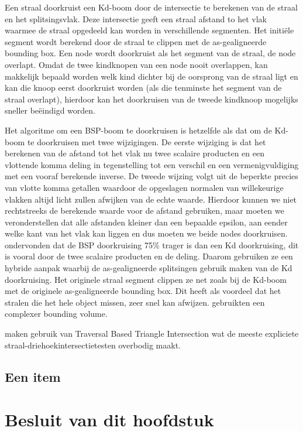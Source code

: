 Een straal doorkruist een Kd-boom door de intersectie te berekenen van de straal en het splitsingsvlak.  
Deze intersectie geeft een straal afstand to het vlak waarmee de straal opgedeeld kan worden in verschillende segmenten.
Het initiële segment wordt berekend door de straal te clippen met de as-gealigneerde bounding box. 
Een node wordt doorkruist als het segment van de straal, de node overlapt.
Omdat de twee kindknopen van een node nooit overlappen, kan makkelijk bepaald worden welk kind dichter bij de oorsprong van de straal ligt en kan die knoop eerst doorkruist worden (als die tenminste het segment van de straal overlapt), hierdoor kan het doorkruisen van de tweede kindknoop mogelijks sneller beëindigd worden. 

Het algoritme om een BSP-boom te doorkruisen is hetzelfde als dat om de Kd-boom te doorkruisen met twee wijzigingen.
De eerste wijziging is dat het berekenen van de afstand tot het vlak nu twee scalaire producten en een vlottende komma deling in tegenstelling tot een verschil en een vermenigvuldiging met een vooraf berekende inverse.
De tweede wijzing volgt uit de beperkte precies van vlotte komma getallen waardoor de opgeslagen normalen van willekeurige vlakken altijd licht zullen afwijken van de echte waarde.
Hierdoor kunnen we niet rechtstreeks de berekende waarde voor de afstand gebruiken, maar moeten we veronderstellen dat alle afstanden kleiner dan een bepaalde epsilon, aan eender welke kant van het vlak kan liggen en dus moeten we beide nodes doorkruisen.
\authorIze{ }ondervonden dat de BSP doorkruising 75\% trager is dan een Kd doorkruising, dit is vooral door de twee scalaire producten en de deling.
Daarom gebruiken ze een hybride aanpak waarbij de as-gealigneerde splitsingen gebruik maken van de Kd doorkruising.
Het originele straal segment clippen ze net zoals bij de Kd-boom met de originele as-gealigneerde bounding box.
Dit heeft als voordeel dat het stralen die het hele object missen, zeer snel kan afwijzen. 
\authorKammaje{ }gebruikten een complexer bounding volume.

\authorIze{ }maken gebruik van Traversal Based Triangle Intersection wat de meeste expliciete straal-driehoekintersectietesten overbodig maakt.

\subsection{Een item}

\section{Besluit van dit hoofdstuk}
